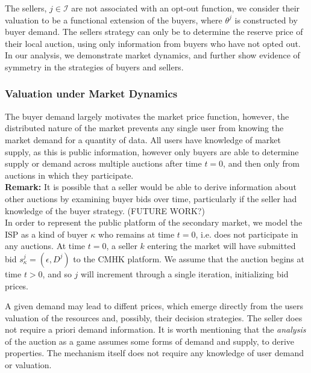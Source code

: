 \documentclass[12pt]{article}
\theoremstyle{definition}
\newcommand{\mcI}{\mathcal{I}}
\begin{document}
\begin{multicols}{2}
The sellers, $j\in\mcI$ are not associated with an opt-out function, we
consider their valuation to be a functional extension of the buyers, where
$\theta^j$ is constructed by buyer demand.
The sellers strategy can only be to determine the reserve price of their local
auction, using only information from buyers who have not opted out.
In our analysis, we demonstrate market dynamics, and further show evidence of symmetry in the strategies of
buyers and sellers.

\subsubsection{Valuation under Market Dynamics}
The buyer demand largely motivates the market price function, however, the
distributed nature of the market prevents any single user from knowing the
market demand for a quantity of data. All users have knowledge of market
supply, as this is public information, however only buyers
are able to determine supply or demand across multiple auctions after time $t=0$, and then only from auctions
in which they participate. \\
\textbf{Remark:}
It is possible that a seller would be able to derive information about other
auctions by examining buyer bids over time, particularly if the seller had knowledge of the
buyer strategy. (FUTURE WORK?)\\
In order to represent the public platform of the secondary market, we model the ISP as
a kind of buyer $\kappa$ who remains at time $t=0$, i.e. does not participate
in any auctions. At time $t=0$, a seller $k$ entering the market will have submitted bid
$s_\kappa^j =(\epsilon, D^j)$ to the CMHK platform. We assume that the auction
begins at time $t>0$, and so $j$ will increment through a single iteration,
initializing bid prices.

A given demand may lead to diffent prices, which emerge directly from the users valuation
of the resources and, possibly, their decision strategies. The seller does not
require a priori demand information.
It is worth mentioning that the \emph{analysis} of the auction as
a game assumes some forms of demand and supply, to derive properties.
The mechanism itself does not require any knowledge of user demand or
valuation. 
\iffalse
The ISP overage
charge inducing an upper bound on the sellers' reserve prices implies that
supply will always be greater than demand, thereby reducing the sellers'
influence on market dynamics.
\fi


\end{multicols}
\end{document}
